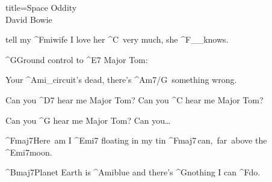 \begin{song}{title=\predtitle\centering Space Oddity \\\large David Bowie  \vspace*{-0.3cm}}
\begin{centerjustified}
	tell my ^{Fmi}wife I love her ^{C\,\,\,}very much, she ^{F{\color{white}\_\_}}knows.

	^{G\z}Ground control to ^{E7\,\,}Major Tom:

	Your ^{Ami{\color{white}\_}}circuit's dead, there's ^{Am7/G\,\,\,}something wrong.

	Can you ^{D7\,\,}hear me Major Tom? Can you ^{C\,\,}hear me Major Tom? 

	Can you ^{G\,\,}hear me Major Tom? Can you\dots

	^{Fmaj7\z}Here~am I ^{Emi7\,\,}floating in my tin ^{Fmaj7\,}can,~far~above the ^{Emi7}moon.

	^{Bmaj7}Planet Earth is ^{Ami}blue and there's ^{G\z}nothing I can ^{F}do.


\end{centerjustified}
\setcounter{Slokočet}{0}
\end{song}

